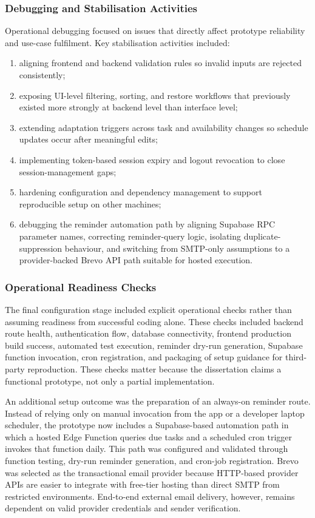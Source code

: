 \documentclass[12pt]{article}
\begin{document}
\subsubsection{Debugging and Stabilisation Activities}
Operational debugging focused on issues that directly affect prototype reliability and use-case fulfilment. Key stabilisation activities included:
\begin{enumerate}
    \item aligning frontend and backend validation rules so invalid inputs are rejected consistently;
    \item exposing UI-level filtering, sorting, and restore workflows that previously existed more strongly at backend level than interface level;
    \item extending adaptation triggers across task and availability changes so schedule updates occur after meaningful edits;
    \item implementing token-based session expiry and logout revocation to close session-management gaps;
    \item hardening configuration and dependency management to support reproducible setup on other machines;
    \item debugging the reminder automation path by aligning Supabase RPC parameter names, correcting reminder-query logic, isolating duplicate-suppression behaviour, and switching from SMTP-only assumptions to a provider-backed Brevo API path suitable for hosted execution.
\end{enumerate}

\subsubsection{Operational Readiness Checks}
The final configuration stage included explicit operational checks rather than assuming readiness from successful coding alone. These checks included backend route health, authentication flow, database connectivity, frontend production build success, automated test execution, reminder dry-run generation, Supabase function invocation, cron registration, and packaging of setup guidance for third-party reproduction. These checks matter because the dissertation claims a functional prototype, not only a partial implementation.

An additional setup outcome was the preparation of an always-on reminder route. Instead of relying only on manual invocation from the app or a developer laptop scheduler, the prototype now includes a Supabase-based automation path in which a hosted Edge Function queries due tasks and a scheduled cron trigger invokes that function daily. This path was configured and validated through function testing, dry-run reminder generation, and cron-job registration. Brevo was selected as the transactional email provider because HTTP-based provider APIs are easier to integrate with free-tier hosting than direct SMTP from restricted environments. End-to-end external email delivery, however, remains dependent on valid provider credentials and sender verification.
\end{document}
